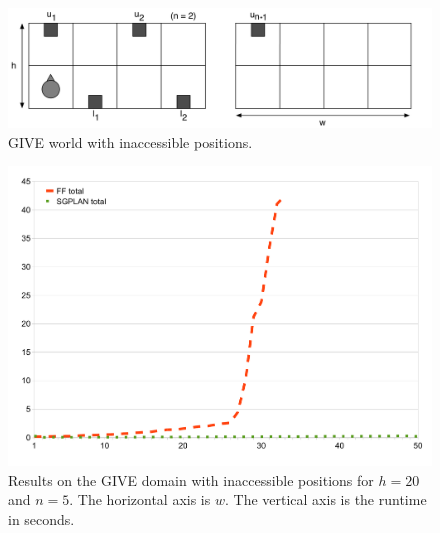 \begin{figure}[t]
  \centering
  \includegraphics[width=0.85\columnwidth]{pic-empty-inaccessible}
  \caption{GIVE world with inaccessible positions.}
  \label{fig:give-junk-nosoln}
\end{figure}

\begin{figure}
  \centering
  \includegraphics[width=0.85\columnwidth]{graph-exp4}
  \caption{Results on the GIVE domain with inaccessible
    positions for $h=20$ and $n=5$. The horizontal axis is $w$.
    The vertical axis is the runtime in seconds.}
  \label{fig:give-runtime-nosoln}
\end{figure}



